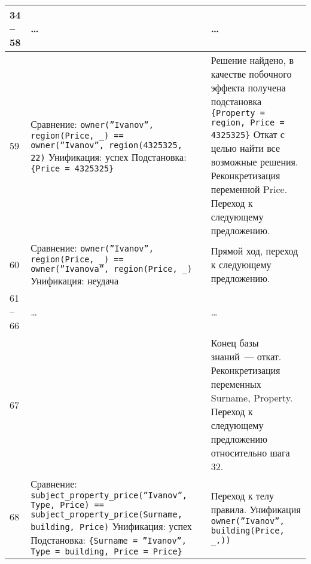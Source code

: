 \begin{xltabular}{\textwidth}{|l|X|Y|}
		34 -- 58 & \centering \dots & \dots \\ \hline

		59 &
		Сравнение:\newline
		\texttt{owner(''Ivanov'', region(Price, \_) == owner(''Ivanov'', region(4325325, 22)} \newline\newline
		Унификация: успех \newline\newline
		Подстановка: \texttt{\{Price = 4325325\}} & 
		Решение найдено, в качестве побочного эффекта получена подстановка \texttt{\{Property = region, Price = 4325325\}} \newline\newline 
		Откат с целью найти все возможные решения.
		Реконкретизация переменной Price.
		Переход к следующему предложению.\\ \hline

		60 &
		Сравнение:\newline
		\texttt{owner(''Ivanov'', region(Price, \_) == owner(''Ivanova'', region(Price, \_)} \newline\newline
		Унификация: неудача &
		Прямой ход, переход к следующему предложению. \\ \hline

		61 -- 66 & \centering \dots & \dots \\ \hline

		67 &
		 &
		Конец базы знаний~--- откат.
		Реконкретизация переменных Surname, Property.
		Переход к следующему предложению относительно шага 32.\\ \hline

		68 &
		Сравнение:\newline
		\texttt{subject\_property\_price(''Ivanov'', Type, Price) == subject\_property\_price(Surname, building, Price)} \newline\newline
		Унификация: успех \newline\newline
		Подстановка:\newline
		\texttt{\{Surname = ''Ivanov'', Type = building, Price = Price\}} & 
		Переход к телу правила. \newline\newline
		Унификация\newline
		\texttt{owner(''Ivanov'', building(Price, \_,))} \\ \hline
		

\end{xltabular}
